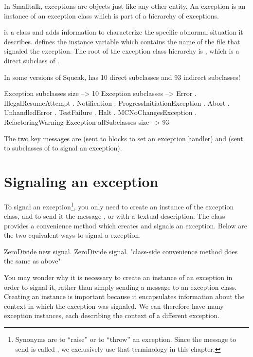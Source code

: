 \documentclass[a4paper,10pt,twoside]{book}
\begin{document}
In Smalltalk, exceptions are objects just like any other entity. An exception is an instance of an exception class which is part of a hierarchy of exceptions.

 is a class and adds information to characterize the specific abnormal situation it describes.  defines the  instance variable which contains the name of the file that signaled the exception. The root of the exception class hierarchy is , which is a direct subclass of .

In some versions of Squeak,  has 10 direct subclasses and 93 indirect subclasses!
\begin{code}{} %
Exception subclasses size     --> 10
Exception subclasses 	        --> {Error . IllegalResumeAttempt . Notification . ProgressInitiationException . Abort . UnhandledError . TestFailure . Halt . MCNoChangesException . RefactoringWarning}
Exception allSubclasses size --> 93
\end{code}

The two key messages are  (sent to blocks to set an exception handler) and  (sent to subclasses of  to signal an exception).

\section{Signaling an exception}

To signal an exception\footnote{Synonyms are to ``raise'' or to ``throw'' an exception. Since the message to send is called , we exclusively use that terminology in this chapter.}, you only need to create an instance of the exception class, and to send it the message , or  with a textual description. The class  provides a convenience method  which creates and signals an exception. Below are the two equivalent ways to signal a  exception.
\begin{code}{}
	ZeroDivide new signal.
	ZeroDivide signal.    "class-side convenience method does the same as above"
\end{code}

You may wonder why it is necessary to create an instance of an exception in order to signal it, rather than simply sending a message to an exception class. Creating an instance is important because it encapsulates information about the context in which the exception was signaled. We can therefore have many exception instances, each describing the context of a different exception.
\end{document}
